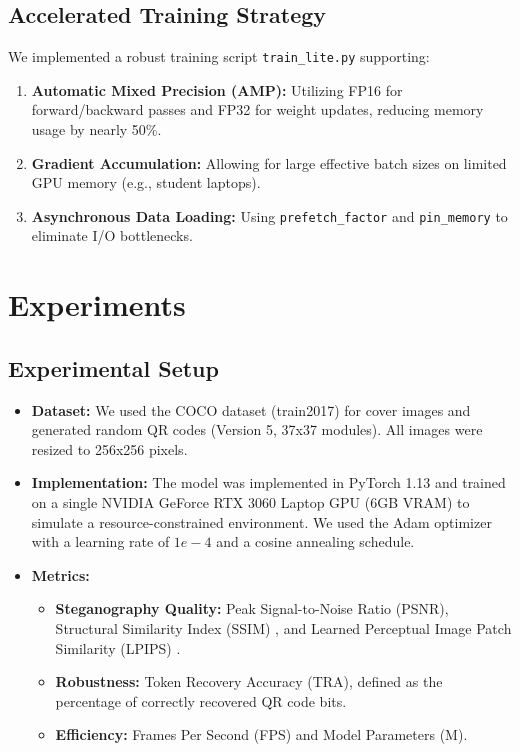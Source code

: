 \documentclass[10pt,twocolumn,letterpaper]{article}
\begin{document}
\subsection{Accelerated Training Strategy}
We implemented a robust training script \texttt{train\_lite.py} supporting:
\begin{enumerate}
    \item \textbf{Automatic Mixed Precision (AMP):} Utilizing FP16 for forward/backward passes and FP32 for weight updates, reducing memory usage by nearly 50\%.
    \item \textbf{Gradient Accumulation:} Allowing for large effective batch sizes on limited GPU memory (e.g., student laptops).
    \item \textbf{Asynchronous Data Loading:} Using \texttt{prefetch\_factor} and \texttt{pin\_memory} to eliminate I/O bottlenecks.
\end{enumerate}

\section{Experiments}

\subsection{Experimental Setup}
\begin{itemize}
    \item \textbf{Dataset:} We used the COCO dataset \cite{coco} (train2017) for cover images and generated random QR codes (Version 5, 37x37 modules). All images were resized to 256x256 pixels.
    \item \textbf{Implementation:} The model was implemented in PyTorch 1.13 and trained on a single NVIDIA GeForce RTX 3060 Laptop GPU (6GB VRAM) to simulate a resource-constrained environment. We used the Adam optimizer \cite{adam} with a learning rate of $1e-4$ and a cosine annealing schedule.
    \item \textbf{Metrics:} 
    \begin{itemize}
        \item \textbf{Steganography Quality:} Peak Signal-to-Noise Ratio (PSNR), Structural Similarity Index (SSIM) \cite{ssim}, and Learned Perceptual Image Patch Similarity (LPIPS) \cite{lpips}.
        \item \textbf{Robustness:} Token Recovery Accuracy (TRA), defined as the percentage of correctly recovered QR code bits.
        \item \textbf{Efficiency:} Frames Per Second (FPS) and Model Parameters (M).
    \end{itemize}
\end{itemize}
\end{document}
